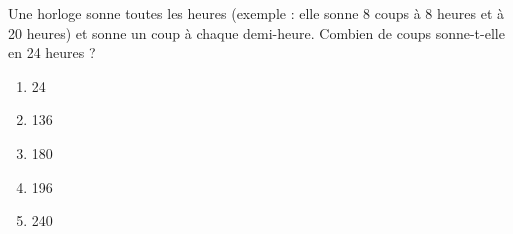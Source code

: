 Une horloge sonne toutes les heures (exemple : elle sonne 8 coups à 8
heures et à 20 heures) et sonne un coup à chaque demi-heure. Combien
de coups sonne-t-elle en 24 heures ?
\begin{multicols}{5}
  \begin{enumerate}[A/]
  \item 24
  \item 136
  \item 180
  \item 196
  \item 240
  \end{enumerate}
\end{multicols}